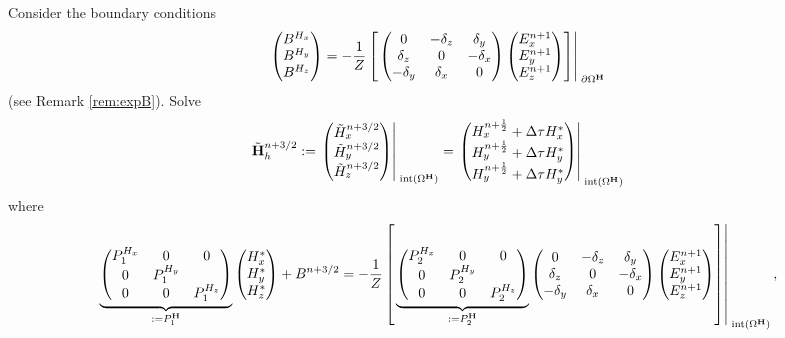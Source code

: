 \documentclass[12pt,reqno]{amsart}
\newcommand{\h}{{\bf H}}
\theoremstyle{definition}
\numberwithin{equation}{section}
\newcommand{\intr}[1]{\mathrm{int}(#1)}
\def\Gw{\Omega}     \def\Gx{\Xi}         \def\Gy{\Psi}
\begin{document}
	Consider the boundary conditions
	\begin{equation}\label{eq:BH}
	\begin{pmatrix}
		B^{H_x}\\ B^{H_y}\\ B^{H_z}
	\end{pmatrix}
	=
	-\frac{1}{Z}
	\left[ \left.	
	\begin{pmatrix}
		0& -\delta_z & \delta _y\\
		\delta_z&0&-\delta_x\\
		-\delta_y&\delta_x&0\\
	\end{pmatrix}
	\begin{pmatrix}
		E_x^{n+1}\\
		E_y^{n+1}\\
		E_z^{n+1}
	\end{pmatrix}\right]\right|_{\; \partial{\Gw^{\h}}}^{\;}
	\end{equation}
	(see Remark \ref{rem:expB}).
Solve
	$$
	\tilde{\h}_h^{n+3/2}:=
	\left.
	\begin{pmatrix}
		\tilde{H}_x^{n+3/2}\\
		\tilde{H}_y^{n+3/2}\\
		\tilde{H}_z^{n+3/2}
	\end{pmatrix}\right|_{\; \intr{\Gw^{\h}}}^{\;}=
\left.
	\begin{pmatrix}
		H_x^{n+\frac{1}{2}}+\Delta \tau H_x^{*}\\
		H_y^{n+\frac{1}{2}}+\Delta \tau H_y^{*}\\
		H_y^{n+\frac{1}{2}}+\Delta \tau H_y^{*}
	\end{pmatrix}\right|_{\; \intr{\Gw^{\h}}}^{\;}
	$$
	where 
	$$
	\underbrace{
	\begin{pmatrix}
		P_1^{H_x}  & 0&0 \\
		0 & 	P_1^{H_y}  &\\
		0&0&	P_1^{H_z} 
	\end{pmatrix}
}_{:=P_1^\h}
	\begin{pmatrix}
		H_x^{*}\\
		H_y^{*} \\
		H_z^{*}
	\end{pmatrix}+B^{n+3/2}=-\frac{1}{Z}
\left[ \left.
	\underbrace{
	\begin{pmatrix}
		P_2^{H_x} & 0&0 \\
		0 & P_2^{H_y} &\\
		0&0&P_2^{H_z} 
	\end{pmatrix}
}_{:=P_2^\h}
	\begin{pmatrix}
		0& -\delta_z & \delta _y\\
		\delta_z&0&-\delta_x\\
		-\delta_y&\delta_x&0\\
	\end{pmatrix}
	\begin{pmatrix}
		E_x^{n+1}\\
		E_y^{n+1}\\
		E_z^{n+1}
	\end{pmatrix}\right]\right|_{\; \intr{\Gw^{\h}}}^{\;},
	$$
\end{document}
